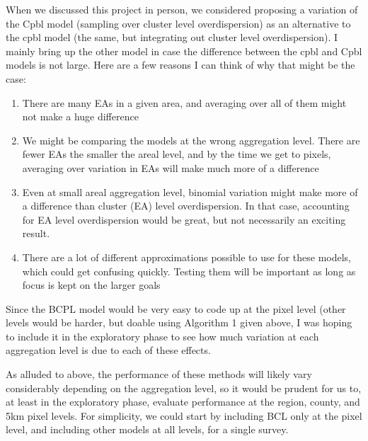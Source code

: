\documentclass[12pt]{article}
\begin{document}
When we discussed this project in person, we considered proposing a variation of the Cpbl model (sampling over cluster level overdispersion) as an alternative to the cpbl model (the same, but integrating out cluster level overdispersion).  I mainly bring up the other model in case the difference between the cpbl and Cpbl models is not large.  Here are a few reasons I can think of why that might be the case:
\begin{enumerate}
\item There are many EAs in a given area, and averaging over all of them might not make a huge difference
\item We might be comparing the models at the wrong aggregation level. There are fewer EAs the smaller the areal level, and by the time we get to pixels, averaging over variation in EAs will make much more of a difference
\item Even at small areal aggregation level, binomial variation might make more of a difference than cluster (EA) level overdispersion. In that case, accounting for EA level overdispersion would be great, but not necessarily an exciting result.
\item There are a lot of different approximations possible to use for these models, which could get confusing quickly. Testing them will be important as long as focus is kept on the larger goals
\end{enumerate}
Since the BCPL model would be very easy to code up at the pixel level (other levels would be harder, but doable using Algorithm 1 given above, I was hoping to include it in the exploratory phase to see how much variation at each aggregation level is due to each of these effects.

As alluded to above, the performance of these methods will likely vary considerably depending on the aggregation level, so it would be prudent for us to, at least in the exploratory phase, evaluate performance at the region, county, and 5km pixel levels. For simplicity, we could start by including BCL only at the pixel level, and including other models at all levels, for a single survey.

%
%

%
\end{document}

